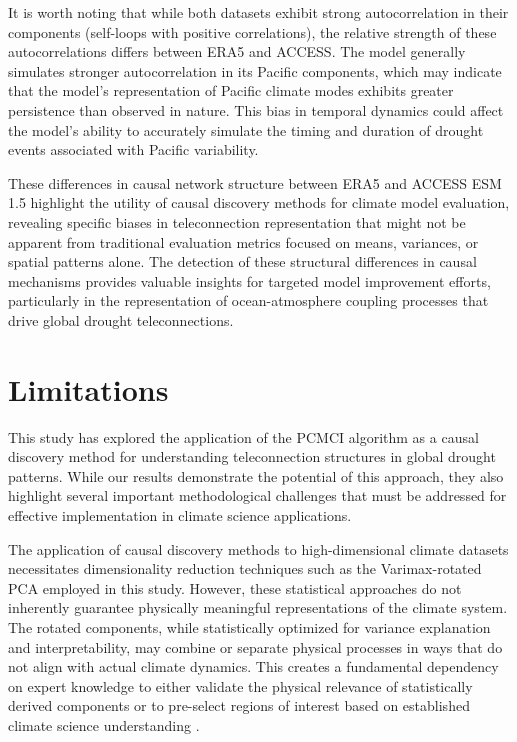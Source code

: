\documentclass[
]{krantz}
\begin{document}
It is worth noting that while both datasets exhibit strong autocorrelation in their components (self-loops with positive correlations), the relative strength of these autocorrelations differs between ERA5 and ACCESS. The model generally simulates stronger autocorrelation in its Pacific components, which may indicate that the model's representation of Pacific climate modes exhibits greater persistence than observed in nature. This bias in temporal dynamics could affect the model's ability to accurately simulate the timing and duration of drought events associated with Pacific variability.

These differences in causal network structure between ERA5 and ACCESS ESM 1.5 highlight the utility of causal discovery methods for climate model evaluation, revealing specific biases in teleconnection representation that might not be apparent from traditional evaluation metrics focused on means, variances, or spatial patterns alone. The detection of these structural differences in causal mechanisms provides valuable insights for targeted model improvement efforts, particularly in the representation of ocean-atmosphere coupling processes that drive global drought teleconnections.

\section{Limitations}\label{limitations}

This study has explored the application of the PCMCI algorithm as a causal discovery method for understanding teleconnection structures in global drought patterns. While our results demonstrate the potential of this approach, they also highlight several important methodological challenges that must be addressed for effective implementation in climate science applications.

The application of causal discovery methods to high-dimensional climate datasets necessitates dimensionality reduction techniques such as the Varimax-rotated PCA employed in this study. However, these statistical approaches do not inherently guarantee physically meaningful representations of the climate system. The rotated components, while statistically optimized for variance explanation and interpretability, may combine or separate physical processes in ways that do not align with actual climate dynamics. This creates a fundamental dependency on expert knowledge to either validate the physical relevance of statistically derived components or to pre-select regions of interest based on established climate science understanding \citep{nowack2020}.
\end{document}
